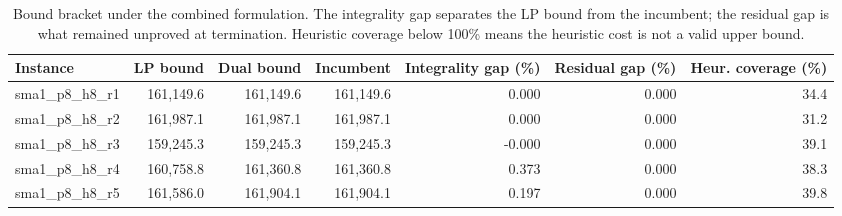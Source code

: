 \begin{table}[htbp]
\centering\small
\caption{Bound bracket under the combined formulation. The integrality gap separates the LP bound from the incumbent; the residual gap is what remained unproved at termination. Heuristic coverage below 100\% means the heuristic cost is not a valid upper bound.}
\label{tab:strength_bounds_bracket}
\begin{tabular}{lrrrrrr}
\toprule
Instance & LP bound & Dual bound & Incumbent & Integrality gap (\%) & Residual gap (\%) & Heur. coverage (\%) \\
\midrule
sma1\_p8\_h8\_r1 & 161,149.6 & 161,149.6 & 161,149.6 & 0.000 & 0.000 & 34.4 \\
sma1\_p8\_h8\_r2 & 161,987.1 & 161,987.1 & 161,987.1 & 0.000 & 0.000 & 31.2 \\
sma1\_p8\_h8\_r3 & 159,245.3 & 159,245.3 & 159,245.3 & -0.000 & 0.000 & 39.1 \\
sma1\_p8\_h8\_r4 & 160,758.8 & 161,360.8 & 161,360.8 & 0.373 & 0.000 & 38.3 \\
sma1\_p8\_h8\_r5 & 161,586.0 & 161,904.1 & 161,904.1 & 0.197 & 0.000 & 39.8 \\
\bottomrule
\end{tabular}
\end{table}
